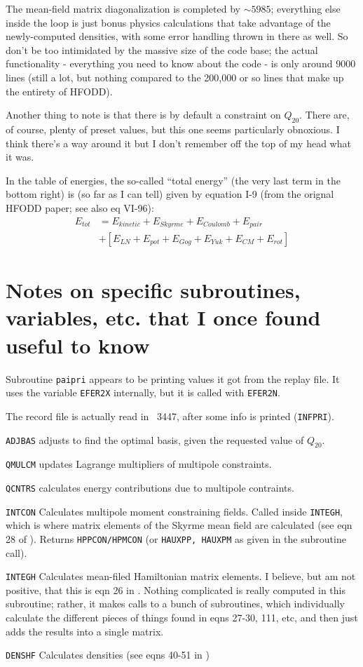 The mean-field matrix diagonalization is completed by $\sim5985$; everything else inside the loop is just bonus physics calculations that take advantage of the newly-computed densities, with some error handling thrown in there as well. So don't be too intimidated by the massive size of the code base; the actual functionality - everything you need to know about the code - is only around 9000 lines (still a lot, but nothing compared to the 200,000 or so lines that make up the entirety of HFODD).

Another thing to note is that there is by default a constraint on $Q_{20}$. There are, of course, plenty of preset values, but this one seems particularly obnoxious. I think there's a way around it but I don't remember off the top of my head what it was.

In the table of energies, the so-called ``total energy'' (the very last term in the bottom right) is (so far as I can tell) given by equation I-9 (from the orignal HFODD paper; see also eq VI-96):
\begin{align}
E_{tot} &= E_{kinetic} + E_{Skyrme} + E_{Coulomb} + E_{pair} \\
& + \left[ E_{LN} + E_{pot} + E_{Gog} + E_{Yuk} + E_{CM} + E_{rot} \right]
\end{align}

\section*{Notes on specific subroutines, variables, etc. that I once found useful to know}

Subroutine \texttt{paipri} appears to be printing values it got from the replay file. It uses the variable \texttt{EFER2X} internally, but it is called with \texttt{EFER2N}.

The record file is actually read in ~3447, after some info is printed (\texttt{INFPRI}).

\texttt{ADJBAS} adjusts to find the optimal basis, given the requested value of $Q_{20}$.

\texttt{QMULCM} updates Lagrange multipliers of multipole constraints.

\texttt{QCNTRS} calculates energy contributions due to multipole contraints.

\texttt{INTCON} Calculates multipole moment constraining fields. Called inside \texttt{INTEGH}, which is where matrix elements of the Skyrme mean field are calculated (see eqn 28 of \cite{Dobaczewski1997}). Returns \texttt{HPPCON/HPMCON} (or \texttt{HAUXPP, HAUXPM} as given in the subroutine call).

\texttt{INTEGH} Calculates mean-filed Hamiltonian matrix elements. I believe, but am not positive, that this is eqn 26 in \cite{Dobaczewski1997}. Nothing complicated is really computed in this subroutine; rather, it makes calls to a bunch of subroutines, which individually calculate the different pieces of things found in eqns 27-30, 111, etc, and then just adds the results into a single matrix.

\texttt{DENSHF} Calculates densities (see eqns 40-51 in \cite{Dobaczewski1997})